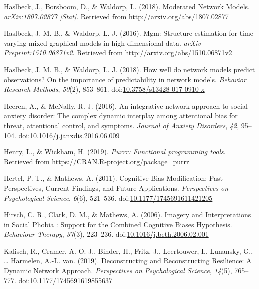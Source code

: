 \documentclass[man,floatsintext]{apa6}
\begin{document}
\leavevmode\hypertarget{ref-haslbeck_moderated_2018}{}%
Haslbeck, J., Borsboom, D., \& Waldorp, L. (2018). Moderated Network Models. \emph{arXiv:1807.02877 {[}Stat{]}}. Retrieved from \url{http://arxiv.org/abs/1807.02877}

\leavevmode\hypertarget{ref-R-mgm}{}%
Haslbeck, J. M. B., \& Waldorp, L. J. (2016). Mgm: Structure estimation for time-varying mixed graphical models in high-dimensional data. \emph{arXiv Preprint:1510.06871v2}. Retrieved from \url{http://arxiv.org/abs/1510.06871v2}

\leavevmode\hypertarget{ref-haslbeck_how_2018}{}%
Haslbeck, J. M. B., \& Waldorp, L. J. (2018). How well do network models predict observations? On the importance of predictability in network models. \emph{Behavior Research Methods}, \emph{50}(2), 853--861. doi:\href{https://doi.org/10.3758/s13428-017-0910-x}{10.3758/s13428-017-0910-x}

\leavevmode\hypertarget{ref-Heeren2016}{}%
Heeren, A., \& McNally, R. J. (2016). An integrative network approach to social anxiety disorder: The complex dynamic interplay among attentional bias for threat, attentional control, and symptoms. \emph{Journal of Anxiety Disorders}, \emph{42}, 95--104. doi:\href{https://doi.org/10.1016/j.janxdis.2016.06.009}{10.1016/j.janxdis.2016.06.009}

\leavevmode\hypertarget{ref-R-purrr}{}%
Henry, L., \& Wickham, H. (2019). \emph{Purrr: Functional programming tools}. Retrieved from \url{https://CRAN.R-project.org/package=purrr}

\leavevmode\hypertarget{ref-Hertel2011}{}%
Hertel, P. T., \& Mathews, A. (2011). Cognitive Bias Modification: Past Perspectives, Current Findings, and Future Applications. \emph{Perspectives on Psychological Science}, \emph{6}(6), 521--536. doi:\href{https://doi.org/10.1177/1745691611421205}{10.1177/1745691611421205}

\leavevmode\hypertarget{ref-Hirsch2006}{}%
Hirsch, C. R., Clark, D. M., \& Mathews, A. (2006). Imagery and Interpretations in Social Phobia : Support for the Combined Cognitive Biases Hypothesis. \emph{Behaviour Therapy}, \emph{37}(3), 223--236. doi:\href{https://doi.org/10.1016/j.beth.2006.02.001}{10.1016/j.beth.2006.02.001}

\leavevmode\hypertarget{ref-kalisch_deconstructing_2019}{}%
Kalisch, R., Cramer, A. O. J., Binder, H., Fritz, J., Leertouwer, I., Lunansky, G., \ldots{} Harmelen, A.-L. van. (2019). Deconstructing and Reconstructing Resilience: A Dynamic Network Approach. \emph{Perspectives on Psychological Science}, \emph{14}(5), 765--777. doi:\href{https://doi.org/10.1177/1745691619855637}{10.1177/1745691619855637}
\end{document}
